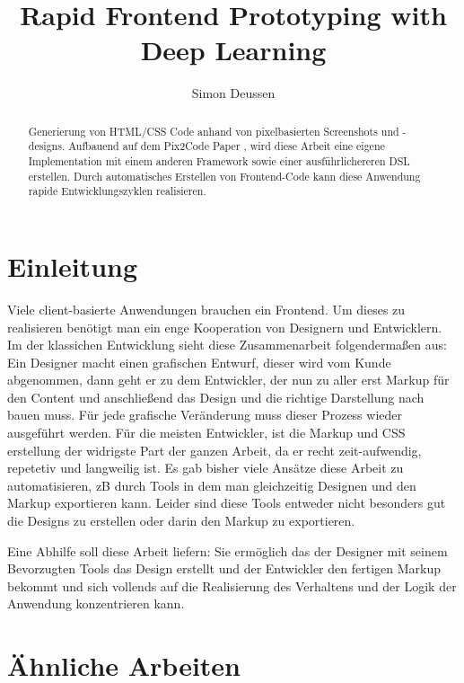 \documentclass[pdftex,a4paper,halfparskip]{scrartcl}
\title{Rapid Frontend Prototyping with Deep Learning} %
\author{Simon Deussen}	%
\begin{document}
\maketitle	

\begin{abstract}
Generierung von HTML/CSS Code anhand von pixelbasierten Screenshots und -designs. Aufbauend auf dem Pix2Code Paper \cite{Beltramelli17}, wird diese Arbeit eine eigene Implementation mit einem anderen Framework sowie einer ausführlichereren DSL erstellen. Durch automatisches Erstellen von Frontend-Code kann diese Anwendung rapide Entwicklungszyklen realisieren.
\end{abstract}


\tableofcontents	%
\section{Einleitung} 

Viele client-basierte Anwendungen brauchen ein Frontend. Um dieses zu realisieren benötigt man ein enge Kooperation von Designern und Entwicklern. Im der klassichen Entwicklung sieht diese Zusammenarbeit folgendermaßen aus: \\
Ein Designer macht einen grafischen Entwurf, dieser wird vom Kunde abgenommen, dann geht er zu dem Entwickler, der nun zu aller erst Markup für den Content und anschließend das Design und die richtige Darstellung nach bauen muss. Für jede grafische Veränderung muss dieser Prozess wieder ausgeführt werden. Für die meisten Entwickler, ist die Markup und CSS erstellung der widrigste Part der ganzen Arbeit, da er recht zeit-aufwendig, repetetiv und langweilig ist. Es gab bisher viele Ansätze diese Arbeit zu automatisieren, zB durch Tools in dem man gleichzeitig Designen und den Markup exportieren kann. Leider sind diese Tools entweder nicht besonders gut die Designs zu erstellen oder darin den Markup zu exportieren.

Eine Abhilfe soll diese Arbeit liefern: Sie ermöglich das der Designer mit seinem Bevorzugten Tools das Design erstellt und der Entwickler den fertigen Markup bekommt und sich vollends auf die Realisierung des Verhaltens und der Logik der Anwendung konzentrieren kann. 

\section{Ähnliche Arbeiten}
\end{document}
